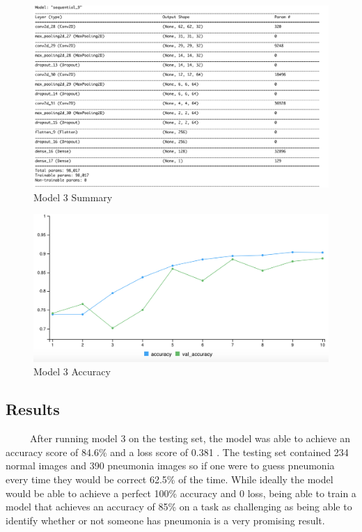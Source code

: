 \documentclass[12pt]{article}
\begin{document}
\begin{figure}

{\centering \includegraphics[width=0.75\linewidth,height=0.25\textheight]{images/model3} 

}

\caption{Model 3 Summary}\label{fig:sample-fig10}
\end{figure}

\begin{figure}

{\centering \includegraphics[width=0.75\linewidth,height=0.25\textheight]{images/model3out} 

}

\caption{Model 3 Accuracy}\label{fig:sample-fig11}
\end{figure}

\hypertarget{results}{%
\subsection{Results}\label{results}}

~~~~~After running model 3 on the testing set, the model was able to
achieve an accuracy score of 84.6\% and a loss score of 0.381 . The
testing set contained 234 normal images and 390 pneumonia images so if
one were to guess pneumonia every time they would be correct 62.5\% of
the time. While ideally the model would be able to achieve a perfect
100\% accuracy and 0 loss, being able to train a model that achieves an
accuracy of 85\% on a task as challenging as being able to identify
whether or not someone has pneumonia is a very promising result.
\end{document}
